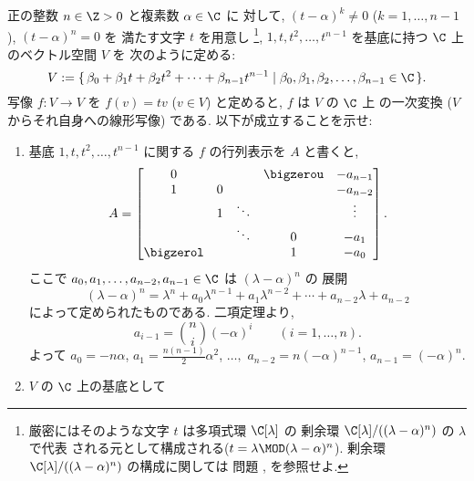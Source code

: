 \documentclass[12pt,twoside]{jarticle}
\begin{document}
\begin{question}[15点]
  \label{q:companion-jordan}
  正の整数 $n\in\Z>0$ と複素数 $\alpha\in\C$ に
  対して, $(t-\alpha)^k\ne 0$ ($k=1,\ldots,n-1$), $(t-\alpha)^n=0$ を
  満たす文字 $t$ を用意し%
  \footnote{厳密にはそのような文字 $t$ は多項式環 $\C[\lambda]$ の
    剰余環 $\C[\lambda]/((\lambda-\alpha)^n)$ の $\lambda$ で代表
    される元として構成される($t=\lambda\MOD(\lambda-\alpha)^n$).
    剰余環 $\C[\lambda]/((\lambda-\alpha)^n)$ の構成に関しては
    問題 ,  を参照せよ.},
  $1,t,t^2,\ldots,t^{n-1}$ を基底に持つ $\C$ 上のベクトル空間 $V$ を
  次のように定める:
  \begin{equation*}
    V := 
    \{\, \beta_0+\beta_1t+\beta_2t^2+\cdots+\beta_{n-1}t^{n-1}
    \mid \beta_0,\beta_1,\beta_2,\ldots,\beta_{n-1}\in\C \,\}.
  \end{equation*}
  写像 $f:V\to V$ を $f(v)=tv$ ($v\in V$) と定めると, $f$ は $V$ の $\C$ 上
  の一次変換 ($V$ からそれ自身への線形写像) である. 
  以下が成立することを示せ:
  \begin{enumerate}
  \item 基底 $1,t,t^2,\ldots,t^{n-1}$ に関する $f$ の行列表示を $A$ と書くと,
    \begin{equation*}
      A =
      \begin{bmatrix}
        0 & & & \bigzerou  & -a_{n-1} \\
        1 & 0 &        &   & -a_{n-2} \\
          & 1 & \ddots &   & \vdots \\
          &   & \ddots & 0 & -a_1 \\
        \bigzerol & &  & 1 & -a_0 \\
      \end{bmatrix}.
    \end{equation*}
    ここで $a_0,a_1,\ldots,a_{n-2},a_{n-1}\in\C$ は $(\lambda-\alpha)^n$ の
    展開
    \begin{equation*}
      (\lambda-\alpha)^n = 
      \lambda^n + a_0\lambda^{n-1} + a_1\lambda^{n-2} + 
      \cdots + a_{n-2}\lambda + a_{n-2}
    \end{equation*}
    によって定められたものである.  二項定理より,
    \begin{equation*}
      a_{i-1} = \binom{n}{i}(-\alpha)^i
      \qquad (i=1,\ldots,n).
    \end{equation*}
    よって $a_0=-n\alpha$, $a_1=\frac{n(n-1)}{2}\alpha^2$, 
    $\ldots,$ $a_{n-2}=n(-\alpha)^{n-1}$, $a_{n-1}=(-\alpha)^n$.
  \item $V$ の $\C$ 上の基底として %

\end{enumerate}
\end{question}
\end{document}
